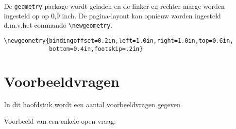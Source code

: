 \documentclass[dutch,a4paper,12pt,addpoints,fleqn,oneside]{tisdexam}
\begin{document}
\medskip
De \verb|geometry| package wordt geladen en de linker en rechter marge worden
ingesteld op op 0,9 inch. De pagina-layout kan opnieuw worden ingesteld
d.m.v.\@ het commando \verb|\newgeometry|.

\begin{lstlisting}
\newgeometry{bindingoffset=0.2in,left=1.0in,right=1.0in,top=0.6in,
             bottom=0.4in,footskip=.2in}
\end{lstlisting}

\section{Voorbeeldvragen}
In dit hoofdstuk wordt een aantal voorbeeldvragen gegeven

\medskip\noindent
Voorbeeld van een enkele open vraag:
\end{document}
